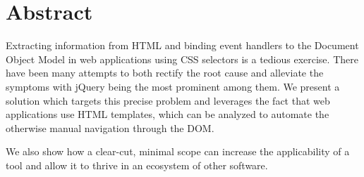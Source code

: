 \documentclass[thesis.tex]{subfiles}
\begin{document}
\chapter*{Abstract}
\label{chap:abstract}

Extracting information from HTML and binding event handlers to the
Document Object Model in web applications using CSS selectors is a tedious
exercise. There have been many attempts to both rectify the root cause and
alleviate the symptoms with jQuery being the most prominent among them.
We present a solution which targets this precise problem and leverages the fact
that web applications use HTML templates, which can be analyzed to automate
the otherwise manual navigation through the DOM.

We also show how a clear-cut, minimal scope can increase the applicability of
a tool and allow it to thrive in an ecosystem of other software.
\end{document}
